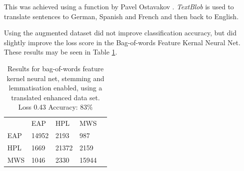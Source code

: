 This was achieved using a function by Pavel Ostavakov \cite{Ostyakov2018}. \textit{TextBlob} is used to translate sentences to German, Spanish and French and then back to English.
  
  Using the augmented dataset did not improve classification accuracy, but did slightly improve the loss score in the Bag-of-words Feature Kernal Neural Net. These results may be seen in Table \ref{tab:bow_nn_res_tran}.
  
\begin{table}[h]
\centering
\begin{tabular}{m{1cm}|m{1cm}|m{1cm}|m{1cm}|m{0cm}}
\multicolumn{1}{m{1cm}}{} & \multicolumn{1}{m{1cm}}{EAP} & \multicolumn{1}{m{1cm}}{HPL} & \multicolumn{1}{m{1cm}}{MWS} &\\[5pt]
\cline{2-4}
EAP & 14952 & 2193 & 987 & \\[5pt]
\cline{2-4}
HPL & 1669 & 21372 & 2159 & \\[5pt]
\cline{2-4}
MWS & 1046 & 2330 & 15944 & \\[5pt]
\cline{2-4}
\end{tabular}
\caption{Results for bag-of-words feature kernel neural net, stemming and lemmatisation enabled, using a translated enhanced data set.\\Loss 0.43 Accuracy: 83\% }
\label{tab:bow_nn_res_tran}
\end{table}

